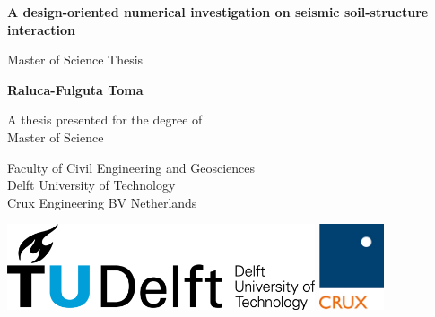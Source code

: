 \documentclass[12pt,a4paper]{report}
\begin{document}
	\begin{titlepage}
		  \begin{center}
		  	\vspace*{3cm}
		  	
		  	\textbf{\Huge A design-oriented numerical investigation on seismic
		  		soil-structure interaction}
		  	
		  	\vspace{1cm}
		  	{\large Master of Science Thesis}
		  	
		  	\vspace{1.5cm}
		  	
		  	\textbf{\Large Raluca-Fulguta Toma}
		  	
		  	\vfill
		  	
		  	A thesis presented for the degree of\\
		  	Master of Science
		  	
		  	\vspace{0.8cm}
		  
		  	
			Faculty of Civil Engineering and Geosciences\\
		  	Delft University of Technology\\
		  	Crux Engineering BV
		  	Netherlands\\
		  	
		  \end{center}
		
		\thispagestyle{empty}
		

		\clearpage
		\thispagestyle{empty}
					
		
		\vspace*{12cm}
		\begin{center}
			\includegraphics[height=1in]{"TUDLogo"}
			\hspace{2em}
			\includegraphics[height=1in]{"CRUXlogo"} \\
	

\end{center}
\end{titlepage}
\end{document}
